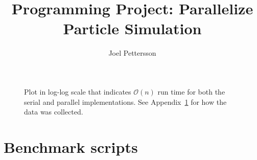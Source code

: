 \documentclass[12pt,a4paper]{article}
\author{Joel Pettersson}
\title{Programming Project: Parallelize Particle Simulation}
\begin{document}
\begin{figure}
    \begin{center}
        
        \caption{Plot in log-log scale that indicates $\mathcal{O}(n)$ run time for
        both the serial and parallel implementations. See
        Appendix~\ref{sec:appendixBenchmarkScripts} for how the data was collected.} 
    \end{center}
\end{figure}



\appendix

\section{Benchmark scripts}
\label{sec:appendixBenchmarkScripts}


\end{document}
